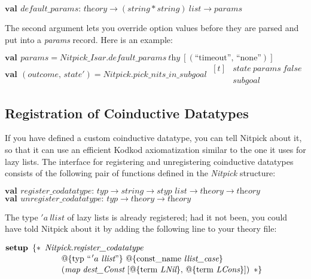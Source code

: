 \documentclass[a4paper,12pt]{article}
\begin{document}
\prew
$\textbf{val}\,~\textit{default\_params} :\,
\textit{theory} \rightarrow (\textit{string} * \textit{string})~\textit{list} \rightarrow \textit{params}$
\postw

The second argument lets you override option values before they are parsed and
put into a \textit{params} record. Here is an example:

\prew
$\textbf{val}\,~\textit{params} = \textit{Nitpick\_Isar.default\_params}~\textit{thy}~[(\textrm{``}\textrm{timeout}\textrm{''},\, \textrm{``}\textrm{none}\textrm{''})]$ \\
$\textbf{val}\,~(\textit{outcome},\, \textit{state}') = \textit{Nitpick.pick\_nits\_in\_subgoal}~\begin{aligned}[t]
& \textit{state}~\textit{params}~\textit{false} \\[-2pt]
& \textit{subgoal}\end{aligned}$
\postw

\let\antiq=\textrm

\subsection{Registration of Coinductive Datatypes}
\label{registration-of-coinductive-datatypes}

If you have defined a custom coinductive datatype, you can tell Nitpick about
it, so that it can use an efficient Kodkod axiomatization similar to the one it
uses for lazy lists. The interface for registering and unregistering coinductive
datatypes consists of the following pair of functions defined in the
\textit{Nitpick} structure:

\prew
$\textbf{val}\,~\textit{register\_codatatype} :\,
\textit{typ} \rightarrow \textit{string} \rightarrow \textit{styp~list} \rightarrow \textit{theory} \rightarrow \textit{theory}$ \\
$\textbf{val}\,~\textit{unregister\_codatatype} :\,
\textit{typ} \rightarrow \textit{theory} \rightarrow \textit{theory}$
\postw

The type $'a~\textit{llist}$ of lazy lists is already registered; had it
not been, you could have told Nitpick about it by adding the following line
to your theory file:

\prew
$\textbf{setup}~\,\{{*}\,~\!\begin{aligned}[t]
& \textit{Nitpick.register\_codatatype} \\[-2pt]
& \qquad @\{\antiq{typ}~``\kern1pt'a~\textit{llist}\textrm{''}\}~@\{\antiq{const\_name}~ \textit{llist\_case}\} \\[-2pt] %
& \qquad (\textit{map}~\textit{dest\_Const}~[@\{\antiq{term}~\textit{LNil}\},\, @\{\antiq{term}~\textit{LCons}\}])\,\ {*}\}\end{aligned}$
\postw
\end{document}
